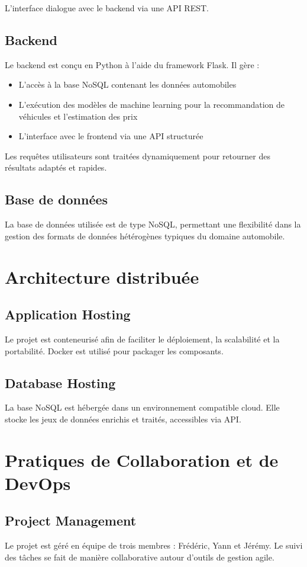 \documentclass[12pt]{report}
\begin{document}
L’interface dialogue avec le backend via une API REST.


\section{Backend}
Le backend est conçu en Python à l’aide du framework Flask. Il gère :

\begin{itemize}
    \item L’accès à la base NoSQL contenant les données automobiles
    \item L’exécution des modèles de machine learning pour la recommandation de véhicules et l’estimation des prix
    \item L’interface avec le frontend via une API structurée
\end{itemize}

Les requêtes utilisateurs sont traitées dynamiquement pour retourner des résultats adaptés et rapides.


\section{Base de données}
La base de données utilisée est de type NoSQL, permettant une flexibilité dans la gestion des formats de données hétérogènes typiques du domaine automobile.

\chapter{Architecture distribuée}
\section{Application Hosting}
Le projet est conteneurisé afin de faciliter le déploiement, la scalabilité et la portabilité. Docker est utilisé pour packager les composants.

\section{Database Hosting}
La base NoSQL est hébergée dans un environnement compatible cloud. Elle stocke les jeux de données enrichis et traités, accessibles via API.

\chapter{Pratiques de Collaboration et de DevOps}
\section{Project Management}
Le projet est géré en équipe de trois membres : Frédéric, Yann et Jérémy. Le suivi des tâches se fait de manière collaborative autour d'outils de gestion agile.
\end{document}
